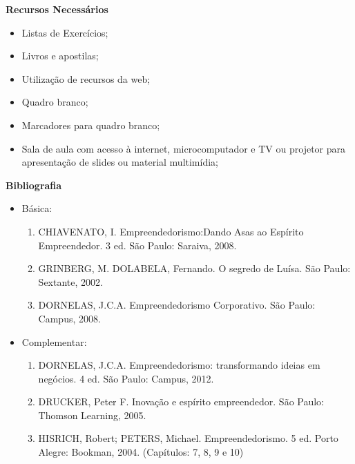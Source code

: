 \begin{snugshade}\begin{center}\textbf{
    Recursos Necessários
    \vphantom{q} %
}\end{center}\end{snugshade}

\begin{itemize}
  \item Listas de Exercícios;
  \item Livros e apostilas;
  \item Utilização de recursos da web;
  \item Quadro branco;
  \item Marcadores para quadro branco;
  \item Sala de aula com acesso à internet, microcomputador e TV ou projetor para apresentação de slides ou material multimídia;
\end{itemize}


\begin{snugshade}\begin{center}\textbf{
    Bibliografia
}\end{center}\end{snugshade}

\begin{itemize} 

\item Básica:

    \begin{enumerate}

    \item CHIAVENATO, I. Empreendedorismo:Dando Asas ao Espírito 		Empreendedor. 3 ed. São Paulo: Saraiva, 2008.

    \item GRINBERG, M.
		DOLABELA, Fernando. O segredo de Luísa. São Paulo: Sextante, 2002.


    \item DORNELAS, J.C.A. Empreendedorismo Corporativo. São Paulo: Campus, 		2008.

    \end{enumerate}

\item Complementar:
	\begin{enumerate} 

    \item DORNELAS, J.C.A. Empreendedorismo: transformando ideias em 		negócios. 4 ed. São Paulo: Campus, 2012.


    \item DRUCKER, Peter F. Inovação e espírito empreendedor. São Paulo: 		Thomson Learning, 2005.

    \item HISRICH, Robert; PETERS, Michael. Empreendedorismo. 5 ed. Porto 		Alegre: Bookman, 2004. (Capítulos: 7, 8, 9 e 10)
	\end{enumerate}

\end{itemize}



